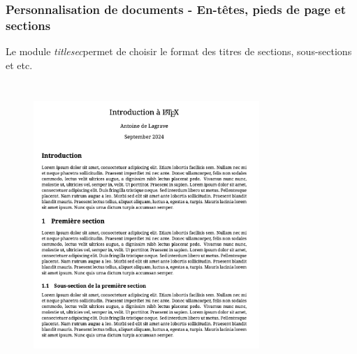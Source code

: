 \begin{frame}
    \frametitle{Personnalisation de documents - En-têtes, pieds de page et sections}
    Le module \textcolor{hard_green}{\textit{titlesec}}\footnotemark permet de choisir le format des titres de sections, sous-sections et etc.
    \begin{columns}
        \begin{figure}
           \centering
            \includegraphics[scale=0.2]{./figures/titlesec.png}
            \label{fig: titlesec}
        \end{figure}
        \begin{figure}
           \centering

\end{figure}
\end{columns}
\end{frame}
